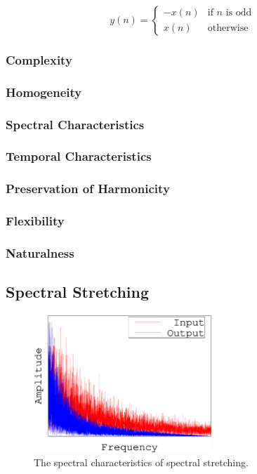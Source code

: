 		\begin{equation}
			y(n) = \begin{cases}
				-x(n) & \text{if $n$ is odd} \\
				x(n) & \text{otherwise}
			\end{cases}
			\label{eq:SpectralFolding}
		\end{equation}

		\subsubsection*{Complexity}
		\subsubsection*{Homogeneity}
		\subsubsection*{Spectral Characteristics}
		\subsubsection*{Temporal Characteristics}
		\subsubsection*{Preservation of Harmonicity}
		\subsubsection*{Flexibility}
		\subsubsection*{Naturalness}

	\subsection{Spectral Stretching}
	\label{sec:Excitation-SpectralStretching}

		\begin{figure}[h!]
			\centering
			\includegraphics[width=0.6\textwidth]{chapter3/Images/SpectralStretching.eps}
			\caption{The spectral characteristics of spectral stretching.}
			\label{fig:SpectralStretching}
		\end{figure}

